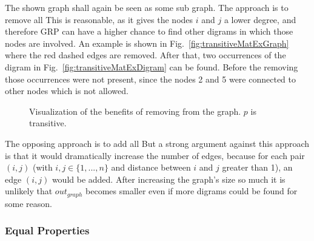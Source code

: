 The shown graph shall again be seen as some sub graph. The approach is to remove all \dtpsp This is reasonable, as it gives the nodes $i$ and $j$ a lower degree, and therefore GRP can have a higher chance to find other digrams in which those nodes are involved. An example is shown in Fig.~\ref{fig:transitiveMatExGraph} where the red dashed edges are removed. After that, two occurrences of the digram in Fig.~\ref{fig:transitiveMatExDigram} can be found. Before the removing those occurrences were not present, since the nodes 2 and 5 were connected to other nodes which is not allowed.

\begin{figure}[h]
	\centering
	\hfill
	\caption{Visualization of the benefits of removing \dtps from the graph. $p$ is transitive.}
	\label{fig:transitiveMatEx}
\end{figure}

The opposing approach is to add all \dtpsp But a strong argument against this approach is that it would dramatically increase the number of edges, because for each pair $(i,j)$ (with $i,j\in \{1,...,n\} $  and distance between $i$ and $j$ greater than 1), an edge $(i,j)$ would be added. After increasing the graph's size so much it is unlikely that $out_{graph}$ becomes smaller even if more digrams could be found for some reason. 


\subsubsection{Equal Properties}\label{sec:approachEqualProperties}

